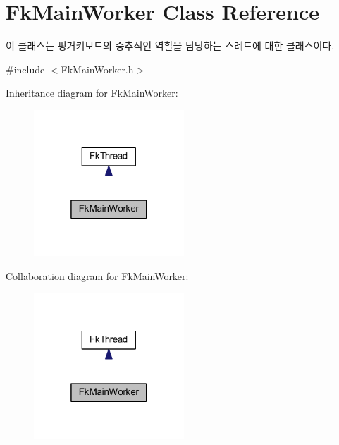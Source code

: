 \hypertarget{class_fk_main_worker}{}\section{Fk\+Main\+Worker Class Reference}
\label{class_fk_main_worker}


이 클래스는 핑거키보드의 중추적인 역할을 담당하는 스레드에 대한 클래스이다.  




{\ttfamily \#include $<$Fk\+Main\+Worker.\+h$>$}



Inheritance diagram for Fk\+Main\+Worker\+:
\nopagebreak
\begin{figure}[H]
\begin{center}
\leavevmode
\includegraphics[width=160pt]{class_fk_main_worker__inherit__graph}
\end{center}
\end{figure}


Collaboration diagram for Fk\+Main\+Worker\+:
\nopagebreak
\begin{figure}[H]
\begin{center}
\leavevmode
\includegraphics[width=160pt]{class_fk_main_worker__coll__graph}
\end{center}
\end{figure}
